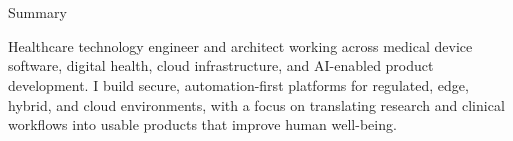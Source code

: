 \section{\faUser}{Summary}
\resumeEntryStart
  \item[] Healthcare technology engineer and architect working across medical device software, digital health, cloud infrastructure, and AI-enabled product development. I build secure, automation-first platforms for regulated, edge, hybrid, and cloud environments, with a focus on translating research and clinical workflows into usable products that improve human well-being.
\resumeEntryEnd
